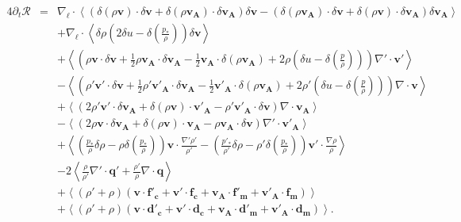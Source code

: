 \begin{equation}
\boxed{
\begin{array}{lcl}
\label{eq:turb_cpi_khm2}\quad 4\partial_t \mathcal{R} &=&  \nabla_{\boldsymbol{\ell}} \cdot \left<\left(\delta \left(\rho\boldsymbol{v}\right) \cdot \delta \boldsymbol{v}+ \delta \left(\rho\boldsymbol{v_A}\right) \cdot \delta \boldsymbol{v_A}\right) \delta \boldsymbol{v}  -\left(\delta \left(\rho\boldsymbol{v_A}\right) \cdot \delta \boldsymbol{v}  + \delta \left(\rho\boldsymbol{v}\right) \cdot \delta \boldsymbol{v_A}  \right) \delta \boldsymbol{v_A} \right>\\
&& + \nabla_{\boldsymbol{\ell}} \cdot \left<\delta \rho  \left(2\delta u - \delta \left(\frac{p_*}{\rho}\right)\right)\delta \boldsymbol{v}\right> \\
&& +\left< \left(\rho \boldsymbol{v} \cdot \delta \boldsymbol{v} +\frac{1}{2} \rho \boldsymbol{v_A} \cdot \delta \boldsymbol{v_A} -\frac{1}{2} \boldsymbol{v_A} \cdot \delta \left(\rho \boldsymbol{v_A}\right) + 2\rho \left(\delta u - \delta \left(\frac{p}{\rho}\right)\right) \right) \nabla' \cdot \boldsymbol{v'} \right>\\
&& -\left<\left( \rho' \boldsymbol{v'} \cdot \delta \boldsymbol{v} +\frac{1}{2} \rho' \boldsymbol{v'_A} \cdot \delta \boldsymbol{v_A} -\frac{1}{2} \boldsymbol{v'_A} \cdot \delta \left(\rho \boldsymbol{v_A}\right) + 2\rho' \left(\delta u - \delta \left(\frac{p}{\rho}\right)\right)  \right)\nabla \cdot \boldsymbol{v}\right>\\
&&+ \left<\left(2 \rho' \boldsymbol{v'} \cdot \delta \boldsymbol{v_A}+ \delta\left(\rho \boldsymbol{v}\right) \cdot \boldsymbol{v'_A} - \rho' \boldsymbol{v'_A} \cdot \delta \boldsymbol{v}  \right)\nabla \cdot \boldsymbol{v_A}\right>\\
&&- \left<\left(2\rho \boldsymbol{v} \cdot \delta \boldsymbol{v_A} + \delta\left(\rho \boldsymbol{v}\right) \cdot \boldsymbol{v_A} - \rho \boldsymbol{v_A} \cdot \delta \boldsymbol{v}  \right)\nabla' \cdot \boldsymbol{v'_A}\right> \\
&&+  \left< \left(\frac{p_*}{\rho} \delta \rho - \rho \delta \left(\frac{p_*}{\rho}\right)  \right)\boldsymbol{v} \cdot \frac{\nabla' \rho'}{\rho'} - \left(\frac{p'_*}{\rho'} \delta \rho - \rho' \delta \left(\frac{p_*}{\rho}\right)  \right)  \boldsymbol{v'} \cdot \frac{\nabla \rho}{\rho} \right>\\
&&-2\left<\frac{\rho}{\rho'}  \nabla' \cdot \boldsymbol{q'} + \frac{\rho'}{\rho}  \nabla \cdot \boldsymbol{q}  \right> \\
&&+  \left<\left(\rho' + \rho\right)\left(\boldsymbol{v} \cdot \boldsymbol{f'_c} + \boldsymbol{v'} \cdot \boldsymbol{f_c} + \boldsymbol{v_A} \cdot \boldsymbol{f'_m} + \boldsymbol{v'_A} \cdot \boldsymbol{f_m}\right) \right>\\
&&+ \left<\left(\rho' + \rho\right)\left(\boldsymbol{v} \cdot \boldsymbol{d'_c} + \boldsymbol{v'} \cdot \boldsymbol{d_c}+\boldsymbol{v_A} \cdot \boldsymbol{d'_m} + \boldsymbol{v'_A} \cdot \boldsymbol{d_m}\right)\right> .
\end{array}}
\end{equation}

